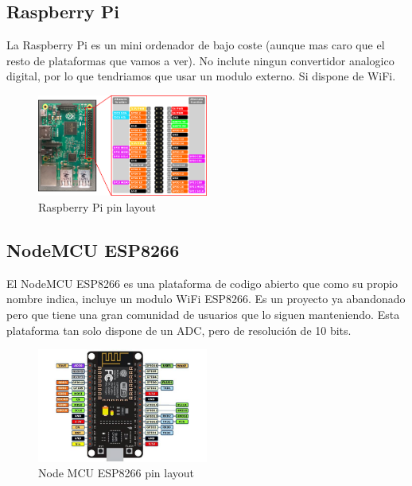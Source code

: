 \begin{titlepage}
\subsection{Raspberry Pi}
La Raspberry Pi\cite{ref9} es un mini ordenador de bajo coste (aunque mas caro que el resto de plataformas que vamos a ver). No inclute ningun convertidor analogico digital, por lo que tendriamos que usar un modulo externo. Si dispone de WiFi.
\begin{figure}[h!] 
	\centering
	\includegraphics[width=0.5\textwidth]{imagenes/rpi.png}
	\caption{Raspberry Pi pin layout\cite{rpi_img}}
\end{figure}
\subsection{ NodeMCU ESP8266}
El NodeMCU ESP8266\cite{ref10} es una plataforma de codigo abierto que como su propio nombre indica, incluye un modulo WiFi ESP8266. Es un proyecto ya abandonado pero que tiene una gran comunidad de usuarios que lo siguen manteniendo. Esta plataforma tan solo dispone de un ADC, pero de resolución de 10 bits. \\
\begin{figure}[h!]
	\centering
	\includegraphics[width=0.5\textwidth]{imagenes/esp8266.jpg}
	\caption{Node MCU ESP8266 pin layout\cite{esp8266_img}}
\end{figure}

\end{titlepage}
